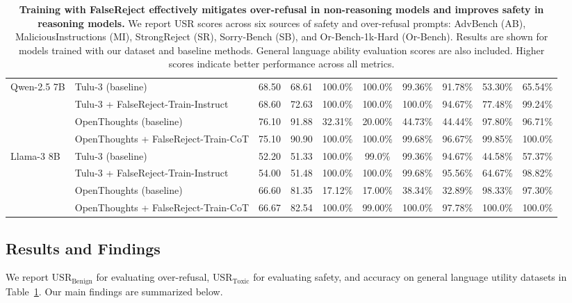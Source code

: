 \documentclass{article} %
\begin{document}
\begin{table}[t!]
{\begin{tabular}{ll|cc|cccc|cc}
\midrule

\multirow{4}{*}{ Qwen-2.5 7B}
& Tulu-3 (baseline)                & 68.50 & 68.61 & 100.0\% & 100.0\% & 99.36\% & 91.78\% & 53.30\% & 65.54\% \\
& Tulu-3 + FalseReject-Train-Instruct         & 68.60 & 72.63 & 100.0\% & 100.0\% & 100.0\% & 94.67\% & 77.48\% & 99.24\% \\
& OpenThoughts (baseline)  & 76.10 &91.88 & 32.31\% & 20.00\% & 44.73\% & 44.44\% & 97.80\% & 96.71\% \\
& OpenThoughts + FalseReject-Train-CoT                  & 75.10 & 90.90 & 100.0\% & 100.0\% & 99.68\% & 96.67\% & 99.85\% & 100.0\% \\
\midrule

\multirow{4}{*}{ Llama-3 8B}
& Tulu-3 (baseline)                & 52.20 & 51.33 & 100.0\% & 99.0\% & 99.36\% & 94.67\% & 44.58\% & 57.37\% \\
& Tulu-3 + FalseReject-Train-Instruct        & 54.00 & 51.48 & 100.0\% & 100.0\% & 99.68\% & 95.56\% & 64.67\% & 98.82\% \\
& OpenThoughts (baseline) & 66.60 & 81.35 & 17.12\% & 17.00\% & 38.34\% & 32.89\% & 98.33\%  & 97.30\% \\
& OpenThoughts + FalseReject-Train-CoT                  & 66.67 & 82.54 & 100.0\% & 99.00\% & 100.0\% & 97.78\% & 100.0\% & 100.0\% \\
\bottomrule
\end{tabular}}
\caption{\small{\textbf{Training with FalseReject effectively mitigates over-refusal in non-reasoning models and improves safety in reasoning models.} We report USR scores across six sources of safety and over-refusal prompts: AdvBench (AB), MaliciousInstructions (MI), StrongReject (SR), Sorry-Bench (SB), and Or-Bench-1k-Hard (Or-Bench). Results are shown for models trained with our dataset and baseline methods. General language ability evaluation scores are also included. Higher scores indicate better performance across all metrics.}}

\label{tab:finetune_results}

\end{table}

\subsection{Results and Findings}

We report $\text{USR}_{\text{Benign}}$ for evaluating over-refusal, $\text{USR}_{\text{Toxic}}$ for evaluating safety, and accuracy on general language utility datasets in Table~\ref{tab:finetune_results}. Our main findings are summarized below.
\end{document}
